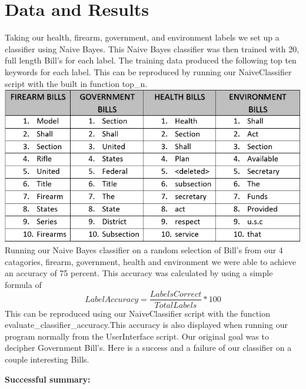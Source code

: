\documentclass[11pt,a4paper]{article}
\begin{document}
  \section{Data and Results}
  Taking our health, firearm, government, and environment labels we set up a classifier using Naive Bayes. This Naive Bayes classifier was then trained with 20, full length Bill's for each label. The training data produced the following top ten keywords for each label. This can be reproduced by running our NaiveClassifier script with the built in function top\_n.
  \newline\newline
  \noindent
  \includegraphics[scale=.60]{figs/naivetop.PNG}
  \newline\newline
  \noindent
  Running our Naive Bayes classifier on a random selection of Bill's from our 4 catagories, firearm, government, health and environment we were able to achieve an accuracy of 75 percent. This accuracy was calculated by using a simple formula of 
  \[ Label Accuracy = \frac {Labels Correct}{Total Labels} * 100\]
  This can be reproduced using our NaiveClassifier script with the function evaluate\_classifier\_accuracy.This accuracy is also displayed when running our program normally from the UserInterface script.
  Our original goal was to decipher Government Bill's. Here is a success and a failure of our classifier on a couple interesting Bills.
 
 
 \noindent\textbf{Successful summary:}
\end{document}

